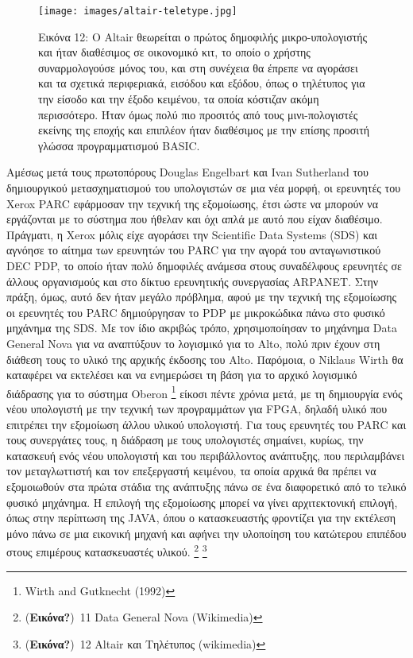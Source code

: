 \documentclass[
]{article}
\begin{document}
\leavevmode{}%
\begin{figure}
\hypertarget{fig:altair-teletype}{%
\centering
\texttt{[image: images/altair-teletype.jpg]}
\caption{Εικόνα 12: O Altair θεωρείται ο πρώτος δημοφιλής
μικρο-υπολογιστής και ήταν διαθέσιμος σε οικονομικό κιτ, το οποίο ο
χρήστης συναρμολογούσε μόνος του, και στη συνέχεια θα έπρεπε να αγοράσει
και τα σχετικά περιφεριακά, εισόδου και εξόδου, όπως ο τηλέτυπος για την
είσοδο και την έξοδο κειμένου, τα οποία κόστιζαν ακόμη περισσότερο. Ήταν
όμως πολύ πιο προσιτός από τους μινι-πολογιστές εκείνης της εποχής και
επιπλέον ήταν διαθέσιμος με την επίσης προσιτή γλώσσα προγραμματισμού
BASIC.}\label{fig:altair-teletype}
}
\end{figure}

Αμέσως μετά τους πρωτοπόρους Douglas Engelbart και Ivan Sutherland του
δημιουργικού μετασχηματισμού του υπολογιστών σε μια νέα μορφή, οι
ερευνητές του Xerox PARC εφάρμοσαν την τεχνική της εξομοίωσης, έτσι ώστε
να μπορούν να εργάζονται με το σύστημα που ήθελαν και όχι απλά με αυτό
που είχαν διαθέσιμο. Πράγματι, η Xerox μόλις είχε αγοράσει την
Scientific Data Systems (SDS) και αγνόησε το αίτημα των ερευνητών του
PARC για την αγορά του ανταγωνιστικού DEC PDP, το οποίο ήταν πολύ
δημοφιλές ανάμεσα στους συναδέλφους ερευνητές σε άλλους οργανισμούς και
στο δίκτυο ερευνητικής συνεργασίας ARPANET. Στην πράξη, όμως, αυτό δεν
ήταν μεγάλο πρόβλημα, αφού με την τεχνική της εξομοίωσης οι ερευνητές
του PARC δημιούργησαν το PDP με μικροκώδικα πάνω στο φυσικό μηχάνημα της
SDS. Με τον ίδιο ακριβώς τρόπο, χρησιμοποίησαν το μηχάνημα Data General
Nova για να αναπτύξουν το λογισμικό για το Alto, πολύ πριν έχουν στη
διάθεση τους το υλικό της αρχικής έκδοσης του Alto. Παρόμοια, ο Niklaus
Wirth θα καταφέρει να εκτελέσει και να ενημερώσει τη βάση για το αρχικό
λογισμικό διάδρασης για το σύστημα Oberon \footnote{Wirth and Gutknecht
  (1992)} είκοσι πέντε χρόνια μετά, με τη δημιουργία ενός νέου
υπολογιστή με την τεχνική των προγραμμάτων για FPGA, δηλαδή υλικό που
επιτρέπει την εξομοίωση άλλου υλικού υπολογιστή. Για τους ερευνητές του
PARC και τους συνεργάτες τους, η διάδραση με τους υπολογιστές σημαίνει,
κυρίως, την κατασκευή ενός νέου υπολογιστή και του περιβάλλοντος
ανάπτυξης, που περιλαμβάνει τον μεταγλωττιστή και τον επεξεργαστή
κειμένου, τα οποία αρχικά θα πρέπει να εξομοιωθούν στα πρώτα στάδια της
ανάπτυξης πάνω σε ένα διαφορετικό από το τελικό φυσικό μηχάνημα. Η
επιλογή της εξομοίωσης μπορεί να γίνει αρχιτεκτονική επιλογή, όπως στην
περίπτωση της JAVA, όπου ο κατασκευαστής φροντίζει για την εκτέλεση μόνο
πάνω σε μια εικονική μηχανή και αφήνει την υλοποίηση του κατώτερου
επιπέδου στους επιμέρους κατασκευαστές υλικού. \footnote{(\textbf{Εικόνα?})~11
  Data General Nova (Wikimedia)} \footnote{(\textbf{Εικόνα?})~12 Altair
  και Τηλέτυπος (wikimedia)}
\end{document}
